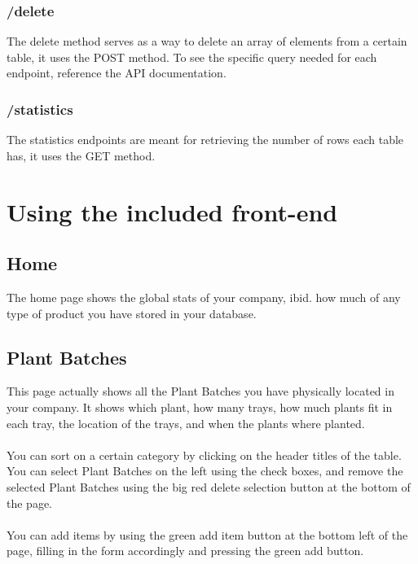 \documentclass{article}
\begin{document}
\subsubsection{/delete}
The delete method serves as a way to delete an array of elements from a certain table, it uses the POST method. To see the specific query needed for each endpoint, reference the API documentation.

\subsubsection{/statistics}
The statistics endpoints are meant for retrieving the number of rows each table has, it uses the GET method. 

\section{Using the included front-end}
\subsection{Home}
The home page shows the global stats of your company, ibid. how much of any type of product you have stored in your database.

\subsection{Plant Batches}
This page actually shows all the Plant Batches you have physically located in your company. It shows which plant, how many trays, how much plants fit in each tray, the location of the trays, and when the plants where planted.\\\\
You can sort on a certain category by clicking on the header titles of the table. You can select Plant Batches on the left using the check boxes, and remove the selected Plant Batches using the big red delete selection button at the bottom of the page.\\\\
You can add items by using the green add item button at the bottom left of the page, filling in the form accordingly and pressing the green add button.
\end{document}
